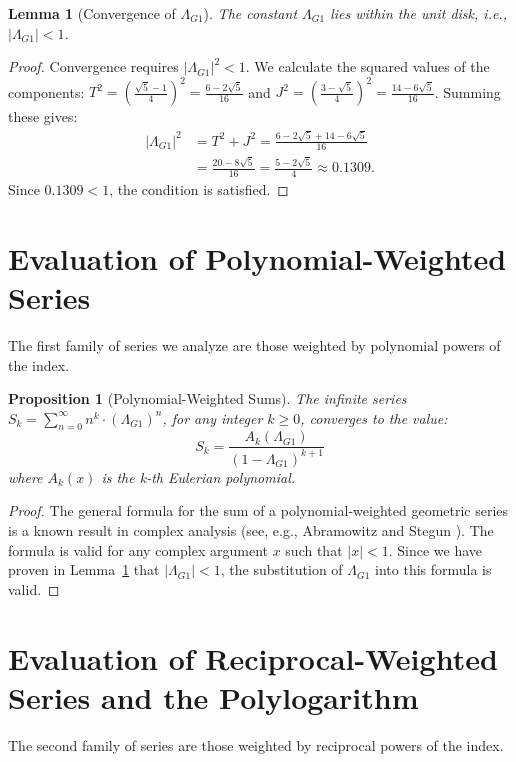 \documentclass{amsart}
\theoremstyle{plain}
\newtheorem{proposition}[proposition]{Proposition}
\newtheorem{lemma}[theorem]{Lemma}
\theoremstyle{definition}
\theoremstyle{remark}
\newcommand{\LambdaG}{\Lambda_{G1}}
\begin{document}
\begin{lemma}[Convergence of $\LambdaG$]
\label{lem:convergence}
The constant $\LambdaG$ lies within the unit disk, i.e., $|\LambdaG| < 1$.
\end{lemma}
\begin{proof}
Convergence requires $|\LambdaG|^2 < 1$. We calculate the squared values of the components:
$T^2 = \left(\frac{\sqrt{5}-1}{4}\right)^2 = \frac{6-2\sqrt{5}}{16}$ and $J^2 = \left(\frac{3-\sqrt{5}}{4}\right)^2 = \frac{14-6\sqrt{5}}{16}$.
Summing these gives:
\begin{align*}
    |\LambdaG|^2 &= T^2+J^2 = \frac{6-2\sqrt{5} + 14-6\sqrt{5}}{16} \\
                 &= \frac{20-8\sqrt{5}}{16} = \frac{5-2\sqrt{5}}{4} \approx 0.1309.
\end{align*}
Since $0.1309 < 1$, the condition is satisfied.
\end{proof}

\section{Evaluation of Polynomial-Weighted Series}
The first family of series we analyze are those weighted by polynomial powers of the index.

\begin{proposition}[Polynomial-Weighted Sums]
The infinite series $S_k = \sum_{n=0}^{\infty} n^k \cdot (\LambdaG)^n$, for any integer $k \ge 0$, converges to the value:
$$S_k = \frac{A_k(\LambdaG)}{(1-\LambdaG)^{k+1}}$$
where $A_k(x)$ is the k-th Eulerian polynomial.
\end{proposition}
\begin{proof}
The general formula for the sum of a polynomial-weighted geometric series is a known result in complex analysis (see, e.g., Abramowitz and Stegun \cite{AandS}). The formula is valid for any complex argument $x$ such that $|x|<1$. Since we have proven in Lemma~\ref{lem:convergence} that $|\LambdaG|<1$, the substitution of $\LambdaG$ into this formula is valid.
\end{proof}

\section{Evaluation of Reciprocal-Weighted Series and the Polylogarithm}
The second family of series are those weighted by reciprocal powers of the index.
\end{document}
